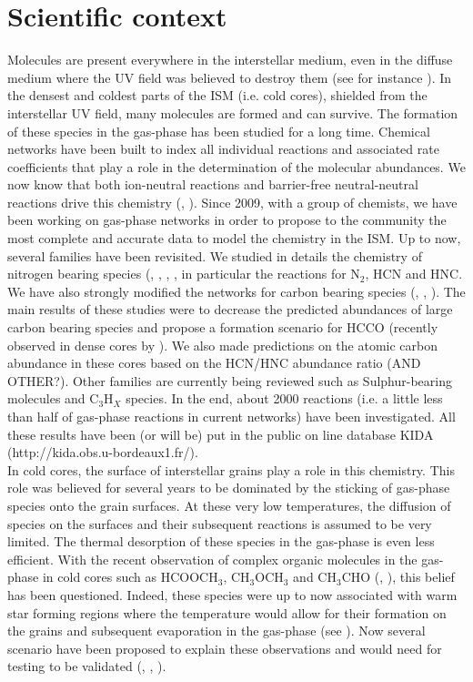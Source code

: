 \section{Scientific context} 

Molecules are present everywhere in the interstellar medium, even in the diffuse medium where the UV field was believed to destroy them (see for instance \cite{2012ApJ...753L..28L}). In the densest and coldest parts of the ISM (i.e. cold cores), shielded from the interstellar UV field, many molecules are formed and can survive. The formation of these species in the gas-phase has been studied for a long time. Chemical networks have been built to index all individual reactions and associated rate coefficients that play a role in the determination of the molecular abundances. We now know that both ion-neutral reactions and barrier-free neutral-neutral reactions drive this chemistry (\cite{2010SSRv..156...13W}, \cite{Smith_2011}). Since 2009, with a group of chemists, we have been working on gas-phase networks in order to propose to the community the most complete and accurate data to model the chemistry in the ISM. Up to now, several families have been revisited. We studied in details the chemistry of nitrogen bearing species (\cite{2013PCCP...1513888D}, \cite{2012PNAS..10910233D}, \cite{2014MNRAS.443..398L}, \cite{2013arXiv1310.4350W}, in particular the reactions for N$_2$, HCN and HNC. We have also strongly modified the networks for carbon bearing species (\cite{Wakelam_2009}, \cite{2014MNRAS.437..930L}, \cite{2015MNRAS.453L..48W}). The main results of these studies were to decrease the predicted abundances of large carbon bearing species and propose a formation scenario for HCCO (recently observed in dense cores by \cite{Ag_ndez_2015}). We also made predictions on the atomic carbon abundance in these cores based on the HCN/HNC abundance ratio (AND OTHER?). Other families are currently being reviewed such as Sulphur-bearing molecules and C$_3$H$_X$ species. In the end, about 2000 reactions (i.e. a little less than half of gas-phase reactions in current networks) have been investigated. All these results have been (or will be) put in the public on line database KIDA (http://kida.obs.u-bordeaux1.fr/). \\
In cold cores, the surface of interstellar grains play a role in this chemistry. This role was believed for several years to be dominated by the sticking of gas-phase species onto the grain surfaces. At these very low temperatures, the diffusion of species on the surfaces and their subsequent reactions is assumed to be very limited. The thermal desorption of these species in the gas-phase is even less efficient. With the recent observation of complex organic molecules in the gas-phase in cold cores such as HCOOCH$_3$, CH$_3$OCH$_3$ and CH$_3$CHO (\cite{Bacmann_2012}, \cite{2014ApJ...795L...2V}), this belief has been questioned. Indeed, these species were up to now associated with warm star forming regions where the temperature would allow for their formation on the grains and subsequent evaporation in the gas-phase (see \cite{Herbst_2009}). Now several scenario have been proposed to explain these observations and would need for testing to be validated (\cite{2013ApJ...769...34V}, \cite{2015MNRAS.449L..16B}, \cite{2015MNRAS.447.4004R}).
